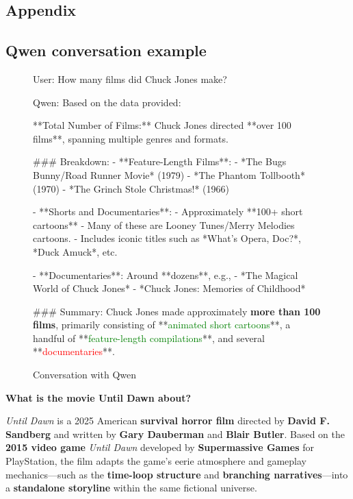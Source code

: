 \documentclass[fleqn,moreauthors,10pt]{ds_report}
\newcommand{\red}[1]{\textcolor{red}{#1}}
\newcommand{\green}[1]{\textcolor{green}{#1}}
\begin{document}
\newpage
\begin{appendix}

\section*{Appendix}
\label{append}

\subsection*{Qwen conversation example}

\begin{figure}
\begin{tcolorbox}
User: How many films did Chuck Jones make?

Qwen: Based on the data provided:

	**Total Number of Films:**  
	Chuck Jones directed **over 100 films**, spanning multiple genres and formats.

	\#\#\# Breakdown:
	- **Feature-Length Films**: 
    		- *The Bugs Bunny/Road Runner Movie* (1979)
	    - *The Phantom Tollbooth* (1970)
	    - *The Grinch Stole Christmas!* (1966)

	- **Shorts and Documentaries**:
	    - Approximately **100+ short cartoons**
	        - Many of these are Looney Tunes/Merry Melodies cartoons.
	        - Includes iconic titles such as *What's Opera, Doc?*, *Duck Amuck*, etc.
    
	    - **Documentaries**: Around **dozens**, e.g.,
	    	    - *The Magical World of Chuck Jones*
	        - *Chuck Jones: Memories of Childhood*

	\#\#\# Summary:
	Chuck Jones made approximately \textbf{more than 100 films}, primarily consisting of **\green{animated short cartoons}**, a handful of **\green{feature-length compilations}**, and several **\red{documentaries}**.
\end{tcolorbox}
\caption{Conversation with Qwen}
\label{qwenconvo}
\end{figure}

\begin{tcolorbox}[breakable,float*,width=\textwidth,title=Conversation Example with Advanced Qwen]

\textbf{What is the movie Until Dawn about?}

\begin{adjustwidth}{20pt}{0pt}

\emph{Until Dawn} is a 2025 American \textbf{survival horror film}
directed by \textbf{David F. Sandberg} and written by \textbf{Gary
Dauberman} and \textbf{Blair Butler}. Based on the \textbf{2015 video
game} \emph{Until Dawn} developed by \textbf{Supermassive Games} for
PlayStation, the film adapts the game's eerie atmosphere and gameplay
mechanics---such as the \textbf{time-loop structure} and
\textbf{branching narratives}---into a \textbf{standalone storyline}
within the same fictional universe.


\end{adjustwidth}
\end{tcolorbox}
\end{appendix}
\end{document}
